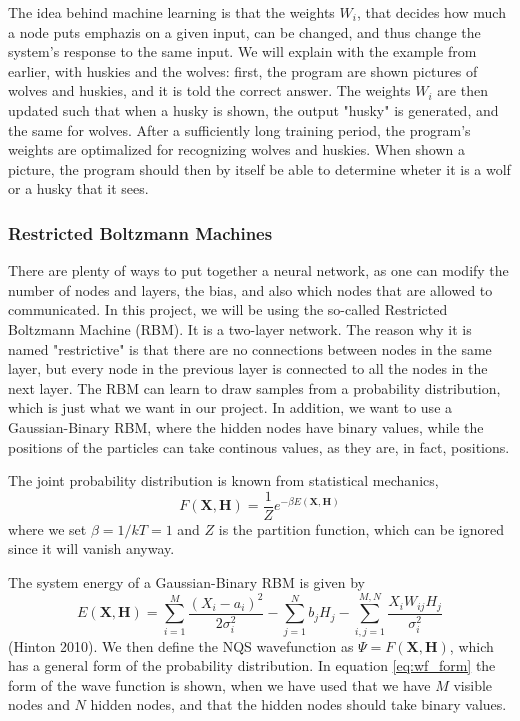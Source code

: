 \documentclass[norsk,a4paper,12pt]{article}
\begin{document}
The idea behind machine learning is that the weights $W_i$, that decides how much a node puts emphazis on a given input, can be changed, and thus change the system's response to the same input. We will explain with the example from earlier, with huskies and the wolves: first, the program are shown pictures of wolves and huskies, and it is told the correct answer. The weights $W_i$ are then updated such that when a husky is shown, the output "husky" is generated, and the same for wolves. After a sufficiently long training period, the program's weights are optimalized for recognizing wolves and huskies. When shown a picture, the program should then by itself be able to determine wheter it is a wolf or a husky that it sees. 

\subsubsection{Restricted Boltzmann Machines} \label{sec:RBM}
There are plenty of ways to put together a neural network, as one can modify the number of nodes and layers, the bias, and also which nodes that are allowed to communicated. In this project, we will be using the so-called Restricted Boltzmann Machine (RBM). It is a two-layer network. The reason why it is named "restrictive" is that there are no connections between nodes in the same layer, but every node in the previous layer is connected to all the nodes in the next layer. The RBM can learn to draw samples from a probability distribution, which is just what we want in our project. In addition, we want to use a Gaussian-Binary RBM, where the hidden nodes have binary values, while the positions of the particles can take continous values, as they are, in fact, positions. 

The joint probability distribution is known from statistical mechanics,
\begin{equation}
\label{eq:F_rbm}
F(\boldsymbol{X},\boldsymbol{H})=\frac{1}{Z}e^{-\beta E(\boldsymbol{X},\boldsymbol{H})}
\end{equation}
where we set $\beta=1/kT=1$ and $Z$ is the partition function, which can be ignored since it will vanish anyway. 

The system energy of a Gaussian-Binary RBM is given by
\begin{equation}
E(\boldsymbol{X},\boldsymbol{H})=\sum_{i=1}^{M}\frac{(X_i-a_i)^2}{2\sigma_i^2}-\sum_{j=1}^Nb_jH_j-\sum_{i,j=1}^{M,N}\frac{X_iW_{ij}H_j}{\sigma_i^2}
\end{equation}
(Hinton 2010). We then define the NQS wavefunction as $\Psi = F(\boldsymbol{X},\boldsymbol{H})$, which has a general form of the probability distribution. In equation \ref{eq:wf_form} the form of the wave function is shown, when we have used that we have $M$ visible nodes and $N$ hidden nodes, and that the hidden nodes should take binary values. 
\end{document}
